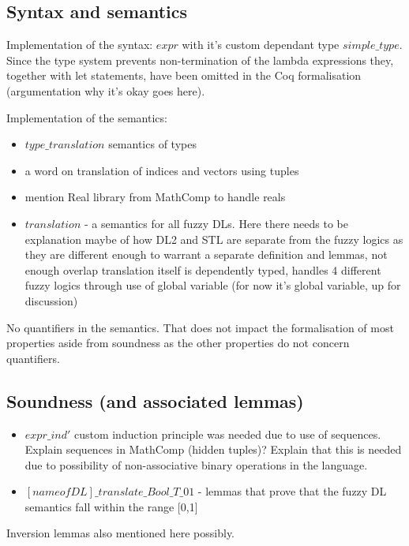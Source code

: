 \documentclass[a4paper,UKenglish,cleveref, autoref, thm-restate]{lipics-v2021}
\begin{document}
\subsection{Syntax and semantics}

Implementation of the syntax: $expr$ with it's custom dependant type $simple\_type$. Since the type system prevents non-termination of the lambda expressions they, together with let statements, have been omitted in the Coq formalisation (argumentation why it's okay goes here).



Implementation of the semantics: 
\begin{itemize}
	\item $type\_translation$ semantics of types
	\item a word on translation of indices and vectors using tuples
	\item mention Real library from MathComp to handle reals
	\item $translation$ - a semantics for all fuzzy DLs. Here there needs to be explanation maybe of how DL2 and STL are separate from the fuzzy logics as they are different enough to warrant a separate definition and lemmas, not enough overlap
	translation itself is dependently typed, handles 4 different fuzzy logics through use of global variable (for now it's global variable, up for discussion)
	
\end{itemize}

No quantifiers in the semantics. That does not impact the formalisation of most properties aside from soundness as the other properties do not concern quantifiers.

\subsection{Soundness (and associated lemmas)}

\begin{itemize}
	\item $expr\_ind'$ custom induction principle was needed due to use of sequences. Explain sequences in MathComp (hidden tuples)? Explain that this is needed due to possibility of non-associative binary operations in the language.
	\item $[name of DL]\_translate\_Bool\_T\_01$ - lemmas that prove that the fuzzy DL semantics fall within the range [0,1]
\end{itemize}

Inversion lemmas also mentioned here possibly.
\end{document}
